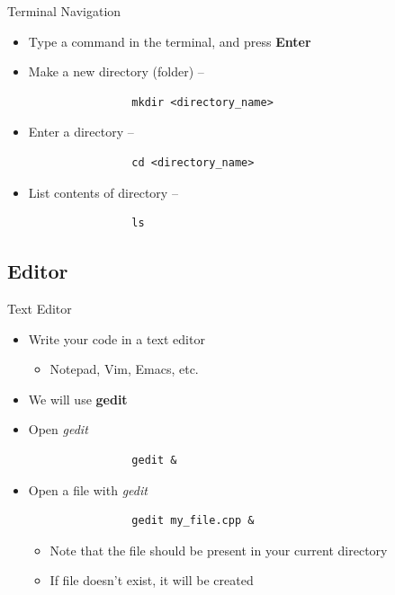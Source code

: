 \begin{frame}[fragile]{Terminal Navigation}
    \begin{itemize}
        \item Type a command in the terminal, and press \textbf{Enter}
        \item Make a new directory (folder) --
            \begin{verbatim}
                mkdir <directory_name>
            \end{verbatim}
        \item Enter a directory --
            \begin{verbatim}
                cd <directory_name>
            \end{verbatim}
        \item List contents of directory --
            \begin{verbatim}
                ls
            \end{verbatim}
    \end{itemize}
\end{frame}

\subsection{Editor}
\begin{frame}[fragile]{Text Editor}
    \begin{itemize}
        \item Write your code in a text editor
            \begin{itemize}
                \item Notepad, Vim, Emacs, etc.
            \end{itemize}
        \pause
        \item We will use \textbf{gedit}
        \pause
        \item Open \emph{gedit}
            \begin{verbatim}
                gedit &
            \end{verbatim}
        \item Open a file with \emph{gedit}
            \begin{verbatim}
                gedit my_file.cpp &
            \end{verbatim}
            \pause
            \begin{itemize}
                \item Note that the file should be present in your current directory
                \item If file doesn't exist, it will be created
            \end{itemize}
    \end{itemize}
\end{frame}
